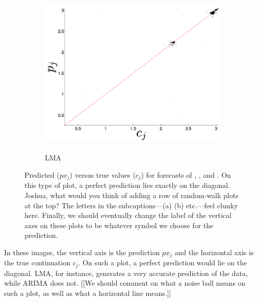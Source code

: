 \begin{figure}[htbp]
\begin{subfigure}{0.6\columnwidth}
    \includegraphics[width=\columnwidth]{figs/svdfiveLMAForecast.png}
    \caption{\svdfive \\ LMA}
    \label{fig:gccLMA}
  \end{subfigure}
   \caption{Predicted ($px_j$) versus true values ($c_j$) for
     forecasts of \col, \gcc, and \svdfive.  On this type of plot, a
     perfect prediction lies exactly on the diagonal.
%
{\color{red} Joshua, what would you think of adding a row of
  random-walk plots at the top?  The letters in the subcaptions---(a)
  (b) etc.---feel clunky here.  Finally, we should eventually change
  the label of the vertical axes on these plots to be whatever symbol
  we choose for the prediction.}
%
}
\label{fig:forecast-example}
\end{figure} 
In these images, the vertical axis is the prediction $px_j$ and the
horizontal axis is the true continuation $c_j$.  On such a plot, a
perfect prediction would lie on the diagonal.  LMA, for instance,
generates a very accurate prediction of the \col data, while ARIMA
does not.  [[We should comment on what a noise ball means on such a
    plot, as well as what a horizontal line means.]]


